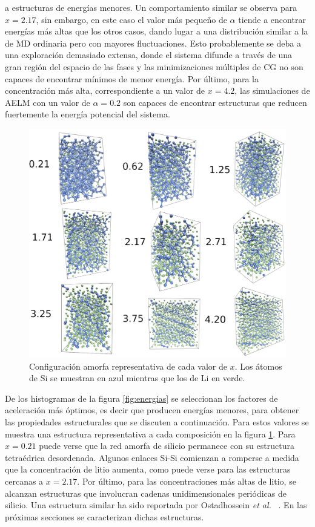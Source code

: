 a estructuras de energías menores. Un comportamiento similar se observa para 
$x = 2.17$, sin embargo, en este caso el valor más pequeño de $\alpha$ tiende a 
encontrar energías más altas que los otros casos, dando lugar a una distribución
similar a la de MD ordinaria pero con mayores fluctuaciones. Esto probablemente 
se deba a una exploración demasiado extensa, donde el sistema difunde a través
de una gran región del espacio de las fases y las minimizaciones múltiples de 
CG no son capaces de encontrar mínimos de menor energía. Por último, para la 
concentración más alta, correspondiente a un valor de $x = 4.2$, las simulaciones 
de AELM con un valor de $\alpha = 0.2$ son capaces de encontrar estructuras que 
reducen fuertemente la energía potencial del sistema. 

\begin{figure}[t]
    \centering
    \includegraphics[width=\textwidth]{Silicio/caracterizacion/resultados/introduccion/amorfas.png}
    \caption{Configuración amorfa representativa de cada valor de $x$. Los átomos
    de Si se muestran en azul mientras que los de Li en verde.}
    \label{fig:amorfas}
\end{figure}
De los histogramas de la figura \ref{fig:energias} se seleccionan los factores 
de aceleración más óptimos, es decir que producen energías menores, para obtener
las propiedades estructurales que se discuten a continuación. Para estos valores
se muestra una estructura representativa a cada composición en la figura 
\ref{fig:amorfas}. Para $x = 0.21$ puede verse que la red amorfa de silicio
permanece con su estructura tetraédrica desordenada. Algunos enlaces Si-Si 
comienzan a romperse a medida que la concentración de litio aumenta, como puede
verse para las estructuras cercanas a $x = 2.17$. Por último, para las 
concentraciones más altas de litio, se alcanzan estructuras que involucran 
cadenas unidimensionales periódicas de silicio. Una estructura similar ha sido 
reportada por Ostadhossein \textit{et al.} ~\cite{ostadhossein2015}. En las 
próximas secciones se caracterizan dichas estructuras.
